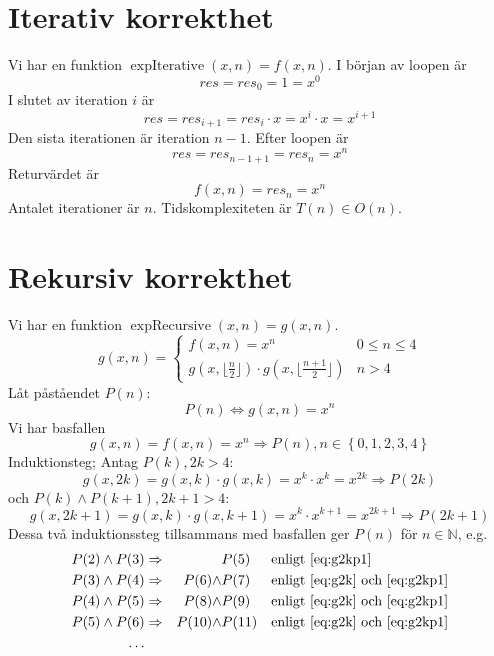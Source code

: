 \documentclass{article}
\begin{document}
\section{Iterativ korrekthet}
Vi har en funktion $\operatorname{expIterative}(x, n) = f(x, n)$.
I början av loopen är
\[ res = res_0 = 1 = x^0 \]
I slutet av iteration $i$ är
\[ res = res_{i + 1} = res_i \cdot x = x^i \cdot x = x^{i + 1} \]
Den sista iterationen är iteration $n - 1$.
Efter loopen är
\[ res = res_{n - 1 + 1} = res_n = x^n \]
Returvärdet är
\[ f(x, n) = res_n = x^n \]
Antalet iterationer är $n$. Tidskomplexiteten är $ T(n) \in O(n)$.

\section{Rekursiv korrekthet}
Vi har en funktion $\operatorname{expRecursive}(x, n) = g(x, n)$.
\[
g(x, n) =
\begin{cases}
f(x, n) = x^n & 0 \leq n \leq 4 \\
g(x, \lfloor \frac{n}{2} \rfloor) \cdot g(x, \lfloor \frac{n + 1}{2} \rfloor) & n > 4
\end{cases}
\]
Låt påståendet $P(n)$:
\[ P(n) \Leftrightarrow g(x, n) = x^n \]
Vi har basfallen
\begin{equation}
\label{eq:gn}
g(x, n) = f(x, n) = x^n \Rightarrow P(n), n \in \left\{0, 1, 2, 3, 4\right\}
\end{equation}
Induktionsteg; Antag $ P(k), 2k > 4 $:
\begin{equation}
\label{eq:g2k}
g(x, 2k) = g(x, k) \cdot g(x, k) = x^k \cdot x^k = x^{2k} \Rightarrow P(2k)
\end{equation}
och $ P(k) \land P(k + 1), 2k + 1 > 4 $:
\begin{equation}
\label{eq:g2kp1}
g(x, 2k + 1) = g(x, k) \cdot g(x, k + 1) = x^{k} \cdot x^{k + 1} = x^{2k + 1} \Rightarrow P(2k + 1)
\end{equation}
Dessa två induktionssteg tillsammans med basfallen ger $ P(n) $ för $ n \in \mathbb{N} $, e.g.
\begin{gather*}
\begin{aligned}
P(2) \land P(3) & \Rightarrow &             & P(5)  && \text{enligt \eqref{eq:g2kp1}} \\
P(3) \land P(4) & \Rightarrow & P(6) \land  & P(7)  && \text{enligt \eqref{eq:g2k} och \eqref{eq:g2kp1}} \\
P(4) \land P(5) & \Rightarrow & P(8) \land  & P(9)  && \text{enligt \eqref{eq:g2k} och \eqref{eq:g2kp1}} \\
P(5) \land P(6) & \Rightarrow & P(10) \land & P(11) && \text{enligt \eqref{eq:g2k} och \eqref{eq:g2kp1}} \\
\dots
\end{aligned}
\end{gather*}
\end{document}

